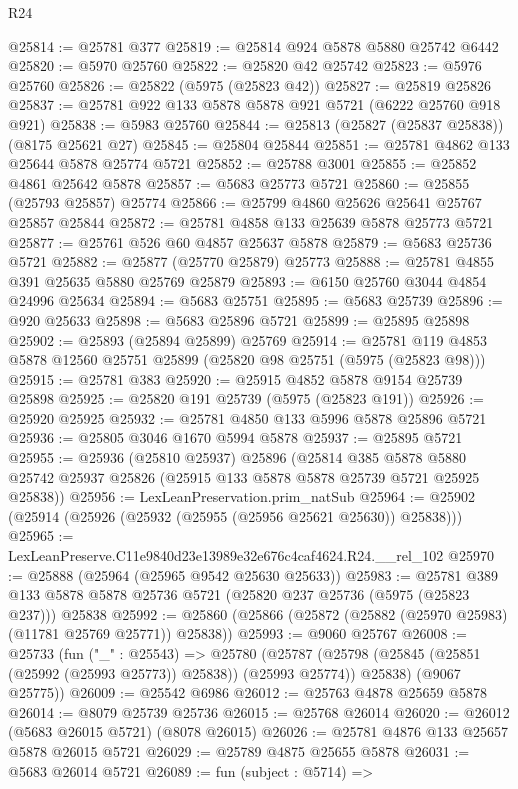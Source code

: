\begin{lexlean}{R24}
\begin{coremodule}
@25814 := @25781 @377
@25819 := @25814 @924 @5878 @5880 @25742 @6442
@25820 := @5970 @25760
@25822 := @25820 @42 @25742
@25823 := @5976 @25760
@25826 := @25822 (@5975 (@25823 @42))
@25827 := @25819 @25826
@25837 := @25781 @922 @133 @5878 @5878 @921 @5721 (@6222 @25760 @918 @921)
@25838 := @5983 @25760
@25844 := @25813 (@25827 (@25837 @25838)) (@8175 @25621 @27)
@25845 := @25804 @25844
@25851 := @25781 @4862 @133 @25644 @5878 @25774 @5721
@25852 := @25788 @3001
@25855 := @25852 @4861 @25642 @5878
@25857 := @5683 @25773 @5721
@25860 := @25855 (@25793 @25857) @25774
@25866 := @25799 @4860 @25626 @25641 @25767 @25857 @25844
@25872 := @25781 @4858 @133 @25639 @5878 @25773 @5721
@25877 := @25761 @526 @60 @4857 @25637 @5878
@25879 := @5683 @25736 @5721
@25882 := @25877 (@25770 @25879) @25773
@25888 := @25781 @4855 @391 @25635 @5880 @25769 @25879
@25893 := @6150 @25760 @3044 @4854 @24996 @25634
@25894 := @5683 @25751
@25895 := @5683 @25739
@25896 := @920 @25633
@25898 := @5683 @25896 @5721
@25899 := @25895 @25898
@25902 := @25893 (@25894 @25899) @25769
@25914 := @25781 @119 @4853 @5878 @12560 @25751 @25899 (@25820 @98 @25751 (@5975 (@25823 @98)))
@25915 := @25781 @383
@25920 := @25915 @4852 @5878 @9154 @25739 @25898
@25925 := @25820 @191 @25739 (@5975 (@25823 @191))
@25926 := @25920 @25925
@25932 := @25781 @4850 @133 @5996 @5878 @25896 @5721
@25936 := @25805 @3046 @1670 @5994 @5878
@25937 := @25895 @5721
@25955 := @25936
    (@25810 @25937)
    @25896
    (@25814
      @385
      @5878
      @5880
      @25742
      @25937
      @25826
      (@25915 @133 @5878 @5878 @25739 @5721 @25925 @25838))
@25956 := LexLeanPreservation.prim_natSub
@25964 := @25902 (@25914 (@25926 (@25932 (@25955 (@25956 @25621 @25630)) @25838)))
@25965 := LexLeanPreserve.C11e9840d23e13989e32e676c4caf4624.R24.__rel_102
@25970 := @25888 (@25964 (@25965 @9542 @25630 @25633))
@25983 := @25781
    @389
    @133
    @5878
    @5878
    @25736
    @5721
    (@25820 @237 @25736 (@5975 (@25823 @237)))
    @25838
@25992 := @25860 (@25866 (@25872 (@25882 (@25970 @25983) (@11781 @25769 @25771)) @25838))
@25993 := @9060 @25767
@26008 := @25733
    (fun ("_" : @25543) =>
    @25780
      (@25787 (@25798 (@25845 (@25851 (@25992 (@25993 @25773)) @25838)) (@25993 @25774)) @25838)
      (@9067 @25775))
@26009 := @25542 @6986
@26012 := @25763 @4878 @25659 @5878
@26014 := @8079 @25739 @25736
@26015 := @25768 @26014
@26020 := @26012 (@5683 @26015 @5721) (@8078 @26015)
@26026 := @25781 @4876 @133 @25657 @5878 @26015 @5721
@26029 := @25789 @4875 @25655 @5878
@26031 := @5683 @26014 @5721
@26089 := fun (subject : @5714) =>

\end{coremodule}
\end{lexlean}
